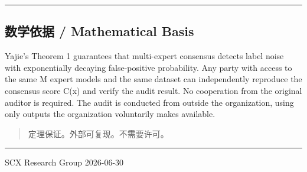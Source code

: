 \documentclass[
  12pt,
]{ctexart}
\begin{document}
\begin{center}\rule{0.5\linewidth}{0.5pt}\end{center}

\subsection{数学依据 / Mathematical
Basis}\label{ux6570ux5b66ux4f9dux636e-mathematical-basis}

Yajie's Theorem 1 guarantees that multi-expert consensus detects label
noise with exponentially decaying false-positive probability. Any party
with access to the same M expert models and the same dataset can
independently reproduce the consensus score C(x) and verify the audit
result. No cooperation from the original auditor is required. The audit
is conducted from outside the organization, using only outputs the
organization voluntarily makes available.

\begin{quote}
定理保证。外部可复现。不需要许可。
\end{quote}

\begin{center}\rule{0.5\linewidth}{0.5pt}\end{center}

SCX Research Group 2026-06-30
\end{document}
